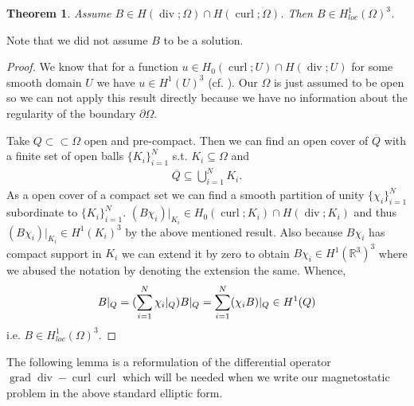 \documentclass[12pt,a4paper]{article}
\numberwithin{equation}{subsection}
\numberwithin{lemma}{subsection}
\newtheorem{theorem}[lemma]{Theorem}
\theoremstyle{definition}
\DeclareMathOperator{\curl}{curl}
\DeclareMathOperator{\diver}{div}
\DeclareMathOperator{\grad}{grad}
\newcommand{\real}{\mathbb{R}}
\begin{document}
\begin{theorem}\label{thm:solution_in_H1loc}
    Assume $B \in H(\diver;\Omega) \cap H(\curl;\Omega)$. Then 
    $B \in H^1_{loc}(\Omega)^3$.
\end{theorem}
\noindent Note that we did not assume $B$ to be a solution.
\begin{proof}
    We know that for a function $u \in H_0(\curl;U) \cap H(\diver;U)$ 
    for some smooth domain $U$ we have $u \in H^1(U)^3$ 
    (cf. \cite[Remark 3.48]{monk}). Our $\Omega$ is just assumed to be open 
    so we can not apply this result directly because we have no information
    about the regularity of the boundary $\partial \Omega$.

    Take $Q \subset\subset \Omega$ open and pre-compact. 
    Then we can find an open 
    cover of $\overline{Q}$ with a finite set of open balls $\{K_i\}_{i=1}^N$
    s.t. $K_i \subseteq \Omega$ and 
    \begin{align*}
        \overline{Q} \subseteq \bigcup\limits_{i=1}^N K_i.
    \end{align*}
    As a open cover of a compact set we can find a smooth partition of unity 
    $\{\chi_i\}_{i=1}^N$ subordinate to $\{K_i\}_{i=1}^N$. 
    $(B \chi_i)|_{K_i} \in H_0(\curl;K_i) \cap H(\diver;K_i)$ and thus 
    $(B \chi_i)|_{K_i} \in H^1(K_i)^3$ by the above mentioned result. 
    Also because $B \chi_i$ has compact support in $K_i$ we can extend it by 
    zero to obtain
    $B \chi_i \in H^1(\real^3)^3$ where we abused the notation by denoting 
    the extension the same. Whence,
    \begin{align*}
        B|_Q = \large( \sum\limits_{i=1}^N \chi_i |_Q \large) B|_Q = 
        \sum\limits_{i=1}^N (\chi_i B)|_Q \in H^1(Q)
    \end{align*}
    i.e. $B \in H^1_{loc}(\Omega)^3$.
\end{proof}

The following lemma is a reformulation of the differential operator 
$\grad \diver - \curl \curl$ which will be needed when we write our 
magnetostatic problem in the above standard elliptic form.
\end{document}
